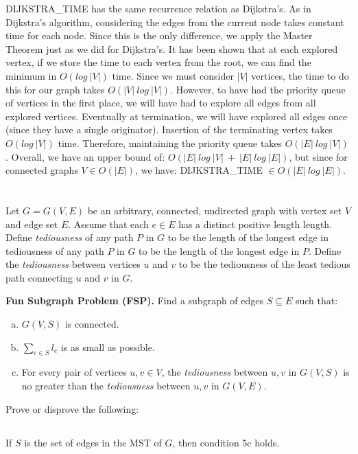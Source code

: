 \documentclass{amsart}
\theoremstyle{definition}
\theoremstyle{remark}
\numberwithin{equation}{section}
\begin{document}
\proof DIJKSTRA\_TIME has the same recurrence relation as Dijkstra's. As in Dijkstra's
algorithm, considering the edges from the current node takes constant time for each node.
Since this is the only difference, we apply the Master Theorem just as we did for 
Dijkstra's. It has been shown that at each explored vertex, if we store the time
to each vertex from the root, we can find the minimum in $O(log\ |V|)$ time. Since
we must consider $|V|$ vertices, the time to do this for our graph takes $O(|V|\ log\ |V|)$.
However, to have had the priority queue of vertices in the first place, we will have
had to explore all edges from all explored vertices. Eventually at termination, we
will have explored all edges once (since they have a single originator). Insertion
of the terminating vertex takes $O(log\ |V|)$ time. Therefore, maintaining the
priority queue takes $O(|E|\ log\ |V|)$. Overall, we have an upper bound of:
$ O(|E|\ log\ |V|\ +\ |E|\ log\ |E|) $, but since for connected graphs $V \in O(|E|)$,
we have: DIJKSTRA\_TIME $\in O(|E|\ log\ |E|)$.


\section{} Let $G = G(V,E)$ be an arbitrary, connected, undirected graph
with vertex set $V$ and edge set $E$. Assume that each $e \in E$ has a
distinct positive length length. Define \textit{tediousness} of any path
$P$ in $G$ to be the length of the longest edge in tediousness of any
path $P$ in $G$ to be the length of the longest edge in $P$. Define the
\textit{tediousness} between vertices $u$ and $v$ to be the tediousness
of the least tedious path connecting $u$ and $v$ in $G$.

\textbf{Fun Subgraph Problem (FSP).} Find a subgraph of edges $S \subseteq E$ such that:

\begin{enumerate}[(a)]
  \item $G(V,S)$ is connected.
  \item $\sum_{e \in S} l_e$ is as small as possible.
  \item For every pair of vertices $u,v \in V$, the \textit{tediousness} between $u,v$ in $G(V,S)$ 
    is no greater than the \textit{tediousness} between $u,v$ in $G(V,E)$.
\end{enumerate}

Prove or disprove the following:

\subsection{} If $S$ is the set of edges in the MST of $G$, then condition 5c holds.
\end{document}
